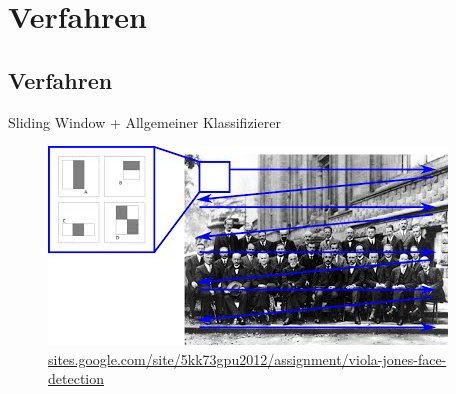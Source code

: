 \section{Verfahren}
\subsection{Verfahren}

\begin{frame}{Sliding Window + Allgemeiner Klassifizierer}
    \begin{figure}[ht]
        \centering
        \includegraphics[width=\textwidth]{../images/sliding_window.jpg}
        \caption{\tiny \href{https://sites.google.com/site/5kk73gpu2012/assignment/viola-jones-face-detection}{sites.google.com/site/5kk73gpu2012/assignment/viola-jones-face-detection}}
        \label{fig:sliding-window}
    \end{figure}
\end{frame}


